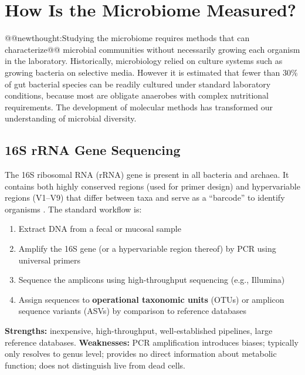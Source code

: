 \documentclass{tufte-handout}
\makeatletter
\def\newthought#1{@@newthought:#1@@}
\makeatother
\begin{document}
\section{How Is the Microbiome Measured?}

\newthought{Studying the microbiome requires methods that can characterize} microbial communities without necessarily growing each organism in the laboratory. Historically, microbiology relied on culture systems such as growing bacteria on selective media.  However it is estimated that fewer than 30\% of gut bacterial species can be readily cultured under standard laboratory conditions, because most are obligate anaerobes with complex nutritional requirements. The development of molecular methods has transformed our understanding of microbial diversity.

\subsection{16S rRNA Gene Sequencing}

The 16S ribosomal RNA (rRNA) gene is present in all bacteria and archaea. It contains both highly conserved regions (used for primer design) and hypervariable regions (V1--V9) that differ between taxa and serve as a ``barcode'' to identify organisms \citep{woesePhylogeneticStructureProkaryotic1977}. The standard workflow is:

\begin{enumerate}
  \item Extract DNA from a fecal or mucosal sample
  \item Amplify the 16S gene (or a hypervariable region thereof) by PCR using universal primers
  \item Sequence the amplicons using high-throughput sequencing (e.g., Illumina)
  \item Assign sequences to \textbf{operational taxonomic units} (OTUs) or amplicon sequence variants (ASVs) by comparison to reference databases
\end{enumerate}

\textbf{Strengths:} inexpensive, high-throughput, well-established pipelines, large reference databases. \textbf{Weaknesses:} PCR amplification introduces biases; typically only resolves to genus level; provides no direct information about metabolic function; does not distinguish live from dead cells.
\end{document}
